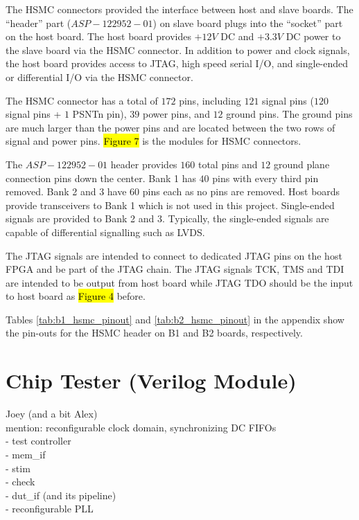 The HSMC connectors provided the interface between host and slave boards. The ``header'' part ($ASP-122952-01$) on slave board plugs into the ``socket'' part on the host board. The host board provides $+12V$ DC and $+3.3V$ DC power to the slave board via the HSMC connector. In addition to power and clock signals, the host board provides access to JTAG, high speed serial I/O, and single-ended or differential I/O via the HSMC connector.

The HSMC connector has a total of $172$ pins, including $121$ signal pins ($120$ signal pins + $1$ PSNTn pin), $39$ power pins, and $12$ ground pins. The ground pins are much larger than the power pins and are located between the two rows of signal and power pins. \hl{Figure 7} is the modules for HSMC connectors.



The $ASP-122952-01$ header provides $160$ total pins and $12$ ground plane connection pins down the center. Bank 1 has $40$ pins with every third pin removed. Bank 2 and 3 have $60$ pins each as no pins are removed. Host boards provide transceivers to Bank 1 which is not used in this project. Single-ended signals are provided to Bank 2 and 3. Typically, the single-ended signals are capable of differential signalling such as LVDS.

The JTAG signals are intended to connect to dedicated JTAG pins on the host FPGA and be part of the JTAG chain. The JTAG signals TCK, TMS and TDI are intended to be output from host board while JTAG TDO should be the input to host board as \hl{Figure 4} before.

Tables \ref{tab:b1_hsmc_pinout} and \ref{tab:b2_hsmc_pinout} in the appendix show the pin-outs for the HSMC header on B1 and B2 boards, respectively.


\section{Chip Tester (Verilog Module)}
Joey  (and a bit Alex) \\
   mention: reconfigurable clock domain, synchronizing DC FIFOs \\
   - test controller \\
     - mem\_if \\
     - stim \\
     - check \\
   - dut\_if (and its pipeline) \\
   - reconfigurable PLL \\


